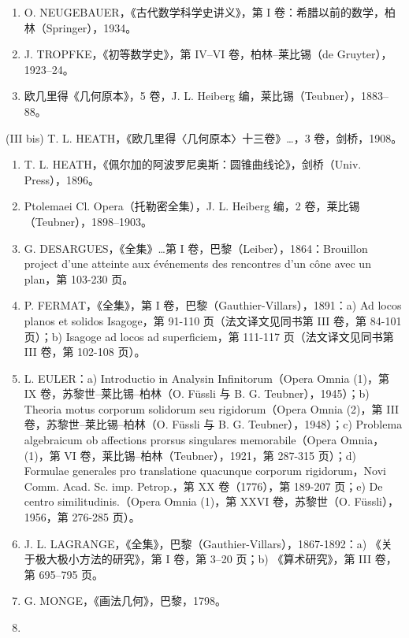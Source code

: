 \begin{enumerate}
\def\labelenumi{(\Roman{enumi})}
\item
  O. NEUGEBAUER，《古代数学科学史讲义》，第 I 卷：希腊以前的数学，柏林（Springer），1934。
\item
  J. TROPFKE，《初等数学史》，第 IV–VI 卷，柏林–莱比锡（de Gruyter），1923–24。
\item
  欧几里得《几何原本》，5 卷，J. L. Heiberg 编，莱比锡（Teubner），1883–88。
\end{enumerate}

(III bis) T. L. HEATH，《欧几里得〈几何原本〉十三卷》\ldots，3 卷，剑桥，1908。

\begin{enumerate}
\def\labelenumi{(\Roman{enumi})}
\setcounter{enumi}{3}
\item
  T. L. HEATH，《佩尔加的阿波罗尼奥斯：圆锥曲线论》，剑桥（Univ. Press），1896。
\item
  Ptolemaei Cl. Opera（托勒密全集），J. L. Heiberg 编，2 卷，莱比锡（Teubner），1898–1903。
\item
  G. DESARGUES，《全集》\ldots 第 I 卷，巴黎（Leiber），1864：Brouillon project d'une atteinte aux événements des rencontres d'un cône avec un plan，第 103-230 页。
\item
  P. FERMAT，《全集》，第 I 卷，巴黎（Gauthier-Villars），1891：a) Ad locos planos et solidos Isagoge，第 91-110 页（法文译文见同书第 III 卷，第 84-101 页）；b) Isagoge ad locos ad superficiem，第 111-117 页（法文译文见同书第 III 卷，第 102-108 页）。
\item
  L. EULER：a) Introductio in Analysin Infinitorum（Opera Omnia (1)，第 IX 卷，苏黎世–莱比锡–柏林（O. Füssli 与 B. G. Teubner），1945）；b) Theoria motus corporum solidorum seu rigidorum（Opera Omnia (2)，第 III 卷，苏黎世–莱比锡–柏林（O. Füssli 与 B. G. Teubner），1948）；c) Problema algebraicum ob affections prorsus singulares memorabile（Opera Omnia，(1)，第 VI 卷，莱比锡–柏林（Teubner），1921，第 287-315 页）；d) Formulae generales pro translatione quacunque corporum rigidorum，Novi Comm. Acad. Sc. imp. Petrop.，第 XX 卷（1776），第 189-207 页；e) De centro similitudinis.（Opera Omnia (1)，第 XXVI 卷，苏黎世（O. Füssli），1956，第 276-285 页）。
\item
  J. L. LAGRANGE，《全集》，巴黎（Gauthier-Villars），1867-1892：a) 《关于极大极小方法的研究》，第 I 卷，第 3–20 页；b) 《算术研究》，第 III 卷，第 695–795 页。
\item
  G. MONGE，《画法几何》，巴黎，1798。
\item

\end{enumerate}
